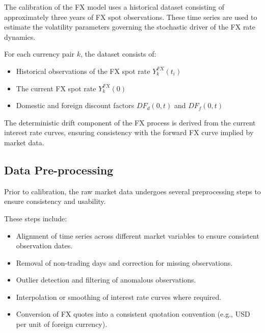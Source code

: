 The calibration of the FX model uses a historical dataset consisting of approximately three years of FX spot observations. These time series are used to estimate the volatility parameters governing the stochastic driver of the FX rate dynamics.

For each currency pair $k$, the dataset consists of:

\begin{itemize}
	
	\item Historical observations of the FX spot rate $Y_k^{FX}(t_i)$
	
	\item The current FX spot rate $Y_k^{FX}(0)$
	
	\item Domestic and foreign discount factors $DF_d(0,t)$ and $DF_f(0,t)$
	
\end{itemize}

The deterministic drift component of the FX process is derived from the current interest rate curves, ensuring consistency with the forward FX curve implied by market data.

\subsection{Data Pre-processing}

Prior to calibration, the raw market data undergoes several preprocessing steps to ensure consistency and usability.

These steps include:

\begin{itemize}
	
	\item Alignment of time series across different market variables to ensure consistent observation dates.
	
	\item Removal of non-trading days and correction for missing observations.
	
	\item Outlier detection and filtering of anomalous observations.
	
	\item Interpolation or smoothing of interest rate curves where required.
	
	\item Conversion of FX quotes into a consistent quotation convention (e.g., USD per unit of foreign currency).
	
\end{itemize}

